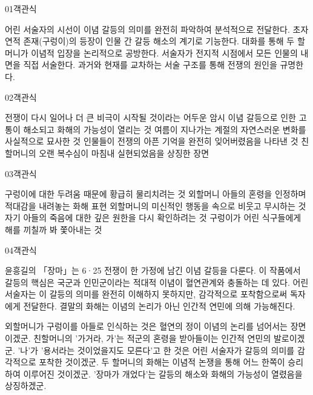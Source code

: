 \documentclass[fs85,seriesWit]{korfarm-base}
\begin{document}
\kfBeginMC
\begin{kfQBlock}{01}{객관식}
\begin{kfChoices}
\kfChoice 어린 서술자의 시선이 이념 갈등의 의미를 완전히 파악하여 분석적으로 전달한다.
\kfChoice 초자연적 존재(구렁이)의 등장이 인물 간 갈등 해소의 계기로 기능한다.
\kfChoice 대화를 통해 두 할머니가 이념적 입장을 논리적으로 공방한다.
\kfChoice 서술자가 전지적 시점에서 모든 인물의 내면을 직접 서술한다.
\kfChoice 과거와 현재를 교차하는 서술 구조를 통해 전쟁의 원인을 규명한다.
\end{kfChoices}
\end{kfQBlock}

\begin{kfQBlock}{02}{객관식}
\begin{kfChoices}
\kfChoice 전쟁이 다시 일어나 더 큰 비극이 시작될 것이라는 어두운 암시
\kfChoice 이념 갈등으로 인한 고통이 해소되고 화해의 가능성이 열리는 것
\kfChoice 여름이 지나가는 계절의 자연스러운 변화를 사실적으로 묘사한 것
\kfChoice 인물들이 전쟁의 아픈 기억을 완전히 잊어버렸음을 나타낸 것
\kfChoice 친할머니의 오랜 복수심이 마침내 실현되었음을 상징한 장면
\end{kfChoices}
\end{kfQBlock}

\begin{kfQBlock}{03}{객관식}
\begin{kfChoices}
\kfChoice 구렁이에 대한 두려움 때문에 황급히 물리치려는 것
\kfChoice 외할머니 아들의 혼령을 인정하며 적대감을 내려놓는 화해 표현
\kfChoice 외할머니의 미신적인 행동을 속으로 비웃고 무시하는 것
\kfChoice 자기 아들의 죽음에 대한 깊은 원한을 다시 확인하려는 것
\kfChoice 구렁이가 어린 식구들에게 해를 끼칠까 봐 쫓아내는 것
\end{kfChoices}
\end{kfQBlock}

\begin{kfQBlock}{04}{객관식}
\begin{kfEvidence}윤흥길의 「장마」는 6·25 전쟁이 한 가정에 남긴 이념 갈등을 다룬다. 이 작품에서 갈등의 핵심은 국군과 인민군이라는 적대적 이념이 혈연관계와 충돌하는 데 있다. 어린 서술자는 이 갈등의 의미를 완전히 이해하지 못하지만, 감각적으로 포착함으로써 독자에게 전달한다. 결말의 화해는 이념의 논리가 아닌 인간적 연민에 의해 가능해진다.\end{kfEvidence}
\begin{kfChoices}
\kfChoice 외할머니가 구렁이를 아들로 인식하는 것은 혈연의 정이 이념의 논리를 넘어서는 장면이겠군.
\kfChoice 친할머니의 '가거라, 가'는 적군의 혼령을 받아들이는 인간적 연민의 발로이겠군.
\kfChoice '나'가 '용서라는 것이었을지도 모른다'고 한 것은 어린 서술자가 갈등의 의미를 감각적으로 포착한 것이겠군.
\kfChoice 두 할머니의 화해는 이념적 논쟁을 통해 어느 한쪽이 승리하여 이루어진 것이겠군.
\kfChoice '장마가 개었다'는 갈등의 해소와 화해의 가능성이 열렸음을 상징하겠군.
\end{kfChoices}
\end{kfQBlock}
\end{document}
